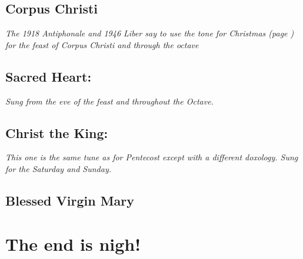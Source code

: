 \documentclass[a5paper,12pt,twoside,openany,oldfontcommands]{memoir}
\newcommand\rubrics[1]{\textit{#1}}
\begin{document}


\goodbreak

\section{Corpus Christi}

\rubrics{The 1918 Antiphonale and 1946 Liber say to use the tone for Christmas (page \pageref{TLchristmas}) for the feast of Corpus Christi and through the octave}

\section{Sacred Heart:}

\rubrics{Sung from the eve of the feast and throughout the Octave.}


\goodbreak


\section{Christ the King:}

\rubrics{This one is the same tune as for Pentecost except with a different doxology. Sung for the Saturday and Sunday.}


\section{Blessed Virgin Mary}




\chapter{The end is nigh!}
\end{document}
